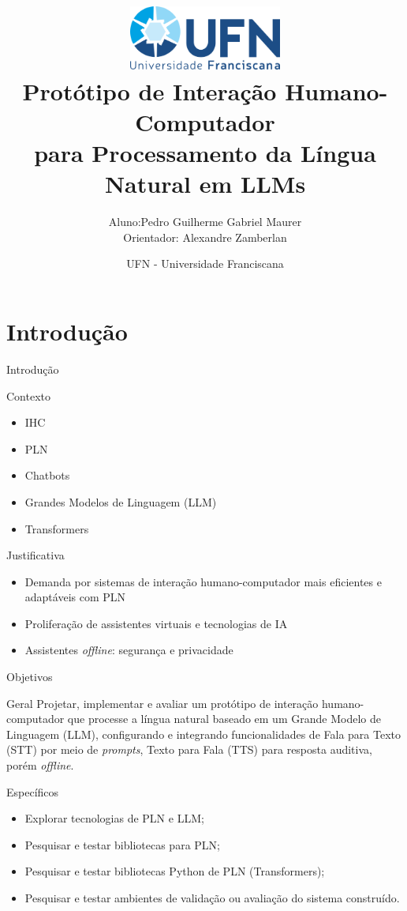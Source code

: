\documentclass{beamer}
\title[TFG Ciência da Computação]{\includegraphics[height=2.1cm]{images/logoUFN.png}\\Protótipo de Interação Humano-Computador\\ para Processamento da Língua Natural em LLMs}
\author{Aluno:Pedro Guilherme Gabriel Maurer \\ Orientador: Alexandre Zamberlan}
\date{UFN - Universidade Franciscana}
\begin{document}
\begin{frame}
  \titlepage
\end{frame}

\section{Introdução}
\begin{frame}[allowframebreaks]{Introdução}
  \begin{block}{Contexto}
    \begin{itemize}
      \item IHC
      \item PLN
      \item Chatbots
      \item Grandes Modelos de Linguagem (LLM)
      \item Transformers
    \end{itemize}
  \end{block}
\end{frame}

\begin{frame}{Justificativa}
  \begin{block}{}
    \begin{itemize}
      \item Demanda por sistemas de interação humano-computador mais eficientes e adaptáveis com PLN
      \item Proliferação de assistentes virtuais e tecnologias de IA
      \item Assistentes \textit{offline}: segurança e privacidade
    \end{itemize}
  \end{block}
\end{frame}

\begin{frame}[allowframebreaks]{Objetivos}
  \begin{block}{Geral}
    Projetar, implementar e avaliar um protótipo de interação humano-computador que processe a língua natural baseado em um Grande Modelo de Linguagem (LLM), configurando e integrando funcionalidades de Fala para Texto (STT) por meio de \textit{prompts}, Texto para Fala (TTS) para resposta auditiva, porém \textit{offline}.
  \end{block}
  
  \begin{block}{Específicos}
    \begin{itemize}
      \item Explorar tecnologias de PLN e LLM;
      \item Pesquisar e testar bibliotecas para PLN;
      \item Pesquisar e testar bibliotecas Python de PLN (Transformers);
      \item Pesquisar e testar ambientes de validação ou avaliação do sistema construído.
    \end{itemize}
  \end{block}
\end{frame}
\end{document}
